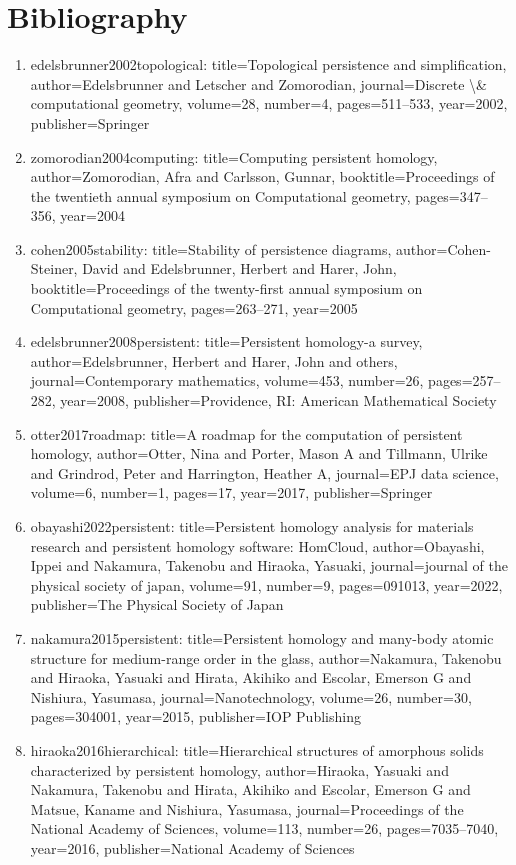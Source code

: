 \documentclass[11pt]{article}
\begin{document}
\section*{Bibliography}
\begin{enumerate}[leftmargin=*]
  \item edelsbrunner2002topological: title=Topological persistence and simplification, author=Edelsbrunner and Letscher and Zomorodian, journal=Discrete \textbackslash{}\& computational geometry, volume=28, number=4, pages=511--533, year=2002, publisher=Springer
  \item zomorodian2004computing: title=Computing persistent homology, author=Zomorodian, Afra and Carlsson, Gunnar, booktitle=Proceedings of the twentieth annual symposium on Computational geometry, pages=347--356, year=2004
  \item cohen2005stability: title=Stability of persistence diagrams, author=Cohen-Steiner, David and Edelsbrunner, Herbert and Harer, John, booktitle=Proceedings of the twenty-first annual symposium on Computational geometry, pages=263--271, year=2005
  \item edelsbrunner2008persistent: title=Persistent homology-a survey, author=Edelsbrunner, Herbert and Harer, John and others, journal=Contemporary mathematics, volume=453, number=26, pages=257--282, year=2008, publisher=Providence, RI: American Mathematical Society
  \item otter2017roadmap: title=A roadmap for the computation of persistent homology, author=Otter, Nina and Porter, Mason A and Tillmann, Ulrike and Grindrod, Peter and Harrington, Heather A, journal=EPJ data science, volume=6, number=1, pages=17, year=2017, publisher=Springer
  \item obayashi2022persistent: title=Persistent homology analysis for materials research and persistent homology software: HomCloud, author=Obayashi, Ippei and Nakamura, Takenobu and Hiraoka, Yasuaki, journal=journal of the physical society of japan, volume=91, number=9, pages=091013, year=2022, publisher=The Physical Society of Japan
  \item nakamura2015persistent: title=Persistent homology and many-body atomic structure for medium-range order in the glass, author=Nakamura, Takenobu and Hiraoka, Yasuaki and Hirata, Akihiko and Escolar, Emerson G and Nishiura, Yasumasa, journal=Nanotechnology, volume=26, number=30, pages=304001, year=2015, publisher=IOP Publishing
  \item hiraoka2016hierarchical: title=Hierarchical structures of amorphous solids characterized by persistent homology, author=Hiraoka, Yasuaki and Nakamura, Takenobu and Hirata, Akihiko and Escolar, Emerson G and Matsue, Kaname and Nishiura, Yasumasa, journal=Proceedings of the National Academy of Sciences, volume=113, number=26, pages=7035--7040, year=2016, publisher=National Academy of Sciences

\end{enumerate}
\end{document}
